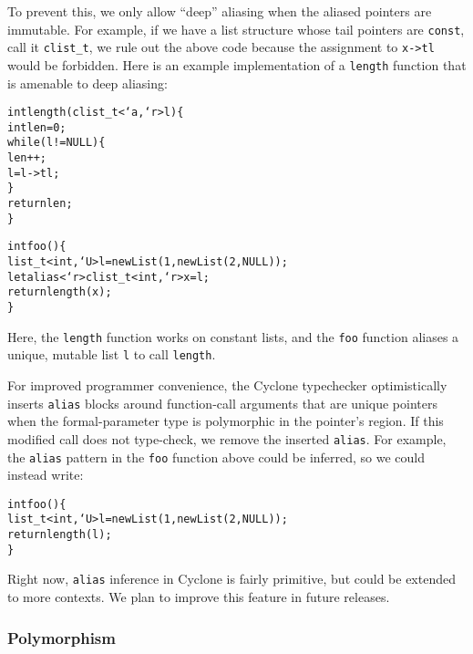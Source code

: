 To prevent this, we only allow ``deep'' aliasing when the aliased pointers
are immutable.  For example, if we have a list structure whose tail pointers
are \texttt{const}, call it \texttt{clist\_t}, we rule out the above code
because the assignment to \texttt{x->tl} would be forbidden.  Here is an
example implementation of a \texttt{length} function that is amenable to
deep aliasing:
\begin{alltt}
  int length(clist\_t<`a,`r> l) \{
    int len = 0;
    while (l != NULL) \{
      len++;
      l = l->tl;
    \}
    return len;
  \}

  int foo() \{
    list\_t<int,`U> l = new List(1,new List(2,NULL));
    let alias <`r>clist\_t<int,`r> x = l;
    return length(x);
  \}
\end{alltt}
Here, the \texttt{length} function works on constant lists, and the
\texttt{foo} function aliases a unique, mutable list \texttt{l} to call
\texttt{length}.

For improved programmer convenience, the Cyclone
typechecker optimistically inserts \texttt{alias} blocks around
function-call arguments that are unique pointers when the
formal-parameter type is polymorphic in the pointer's region.  If this
modified call does not type-check, we remove the inserted \texttt{alias}.
For example, the \texttt{alias} pattern in the \texttt{foo} function above
could be inferred, so we could instead write:
\begin{alltt}
  int foo() \{
    list\_t<int,`U> l = new List(1,new List(2,NULL));
    return length(l);
  \}
\end{alltt}
Right now, \texttt{alias} inference in Cyclone is fairly primitive, but
could be extended to more contexts.  We plan to improve this feature in
future releases.

\subsubsection{Polymorphism}
\label{sec:poly-allocate}

